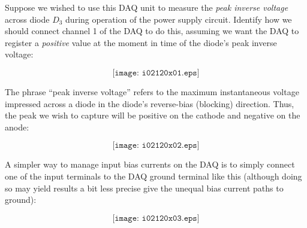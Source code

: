

Suppose we wished to use this DAQ unit to measure the {\it peak inverse voltage} across diode $D_3$ during operation of the power supply circuit.  Identify how we should connect channel 1 of the DAQ to do this, assuming we want the DAQ to register a {\it positive} value at the moment in time of the diode's peak inverse voltage:

$$\texttt{[image: i02120x01.eps]}$$







The phrase ``peak inverse voltage'' refers to the maximum instantaneous voltage impressed across a diode in the diode's reverse-bias (blocking) direction.  Thus, the peak we wish to capture will be positive on the cathode and negative on the anode:

$$\texttt{[image: i02120x02.eps]}$$

A simpler way to manage input bias currents on the DAQ is to simply connect one of the input terminals to the DAQ ground terminal like this (although doing so may yield results a bit less precise give the unequal bias current paths to ground):

$$\texttt{[image: i02120x03.eps]}$$












